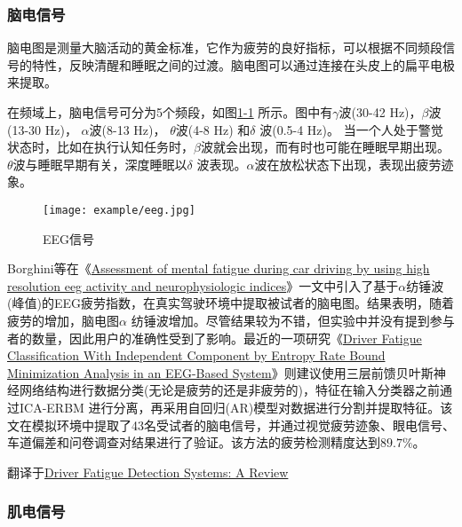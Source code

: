 \subsubsection{脑电信号}

脑电图是测量大脑活动的黄金标准，它作为疲劳的良好指标，可以根据不同频段信号的特性，反映清醒和睡眠之间的过渡。脑电图可以通过连接在头皮上的扁平电极来提取。

在频域上，脑电信号可分为5个频段，如图\href{fig:1-1}{1-1} 所示。图中有$\gamma$波(30-42 Hz)，$\beta$波(13-30 Hz)， $\alpha$波(8-13 Hz)， $\theta$波(4-8 Hz) 和$\delta$ 波(0.5-4 Hz)。 当一个人处于警觉状态时，比如在执行认知任务时，$\beta$波就会出现，而有时也可能在睡眠早期出现。$\theta$波与睡眠早期有关，深度睡眠以$\delta$ 波表现。$\alpha$波在放松状态下出现，表现出疲劳迹象。

\begin{figure}[!htp]

\centering
\texttt{[image: example/eeg.jpg]}
\caption{EEG信号}
\label{fig:1-1}

\end{figure}

Borghini等在《\href{https://xueshu.baidu.com/usercenter/paper/show?paperid=0847723933c31c989a8acc86884b0e17&site=xueshu_se}{Assessment of mental fatigue during car driving by using high resolution eeg activity and neurophysiologic indices}》一文中引入了基于$\alpha$纺锤波(峰值)的EEG疲劳指数，在真实驾驶环境中提取被试者的脑电图。结果表明，随着疲劳的增加，脑电图$\alpha$ 纺锤波增加。尽管结果较为不错，但实验中并没有提到参与者的数量，因此用户的准确性受到了影响。最近的一项研究《\href{https://xueshu.baidu.com/usercenter/paper/show?paperid=ec185cd8a8353f4bf65b7057235907c4&site=xueshu_se}{Driver Fatigue Classification With Independent Component by Entropy Rate Bound Minimization Analysis in an EEG-Based System}》则建议使用三层前馈贝叶斯神经网络结构进行数据分类(无论是疲劳的还是非疲劳的)，特征在输入分类器之前通过ICA-ERBM 进行分离，再采用自回归(AR)模型对数据进行分割并提取特征。该文在模拟环境中提取了43名受试者的脑电信号，并通过视觉疲劳迹象、眼电信号、车道偏差和问卷调查对结果进行了验证。该方法的疲劳检测精度达到$89.7\%$。

翻译于\href{https://xueshu.baidu.com/usercenter/paper/show?paperid=1r7a06p0ve7m08y0s32w0jq04r498130&site=xueshu_se}{Driver Fatigue Detection Systems: A Review}

\subsubsection{肌电信号}

